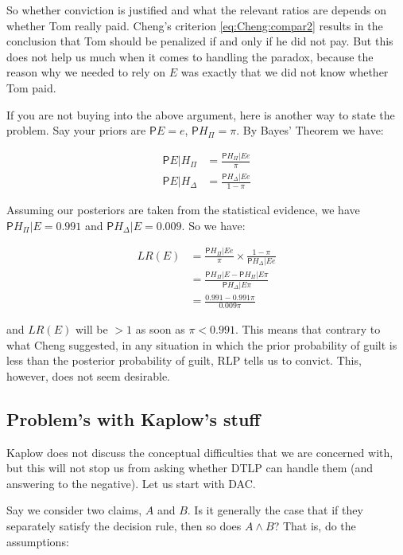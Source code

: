 \documentclass[10pt,dvipsnames,enabledeprecatedfontcommands]{scrartcl}
\newcommand{\et}{\wedge}
\newcommand{\pr}{\mathsf{P}}
\begin{document}
So whether conviction is justified and what the relevant ratios are
depends on whether Tom really paid. Cheng's criterion
\eqref{eq:Cheng:compar2} results in the conclusion that Tom should be
penalized if and only if he did not pay. But this does not help us much
when it comes to handling the paradox, because the reason why we needed
to rely on \(E\) was exactly that we did not know whether Tom paid.

If you are not buying into the above argument, here is another way to
state the problem. Say your priors are \(\pr{E}=e\), \(\pr{H_\Pi}=\pi\).
By Bayes' Theorem we have:

\begin{align*}
 \pr{E\vert H_\Pi} & = \frac{\pr{H_\Pi\vert E}e}{\pi}\\
 \pr{E\vert H_\Delta} & = \frac{\pr{H_\Delta\vert E}e}{1-\pi}
 \end{align*}

\noindent Assuming our posteriors are taken from the statistical
evidence, we have \(\pr{H_\Pi\vert E}=0.991\) and
\(\pr{H_\Delta\vert E }=0.009\). So we have:

\begin{align}
 \label{eq:Cheng_lre} LR(E) & = \frac{\pr{H_\Pi\vert E}e}{\pi}\times \frac{1-\pi}{\pr{H_\Delta\vert E}e}\\ \nonumber
 & = \frac{\pr{H_\Pi \vert E} - \pr{H_\Pi\vert E}\pi}{\pr{H_\Delta\vert E}\pi}\\ \nonumber
 & = \frac{0.991-0.991\pi}{0.009\pi}
 \end{align}

\noindent and \(LR(E)\) will be \(>1\) as soon as \(\pi<0.991\). This
means that contrary to what Cheng suggested, in any situation in which
the prior probability of guilt is less than the posterior probability of
guilt, RLP tells us to convict. This, however, does not seem desirable.

\subsection{Problem's with Kaplow's
stuff}\label{problems-with-kaplows-stuff}

Kaplow does not discuss the conceptual difficulties that we are
concerned with, but this will not stop us from asking whether DTLP can
handle them (and answering to the negative). Let us start with DAC.

Say we consider two claims, \(A\) and \(B\). Is it generally the case
that if they separately satisfy the decision rule, then so does
\(A\et B\)? That is, do the assumptions:
\end{document}
